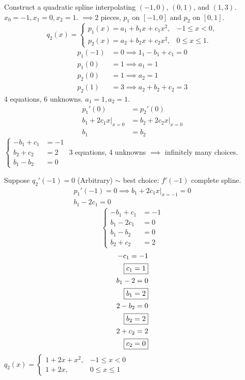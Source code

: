\documentclass[]{article}
\begin{document}
\begin{example}
	Construct a quadratic spline interpolating $(-1,0)$, $(0,1)$, and $(1,3)$.
	$x_0=-1,x_1=0,x_2=1$. 
	$\implies 2$ pieces, $p_1$ on $[-1,0]$ and $p_2$ on $[0,1]$.
	$$ q_2(x) = \begin{cases} p_1(x) = a_1+b_1x+c_1x^2, & -1\leq x<0, \\ p_2(x) = a_2+b_2x+c_2x^2, & 0\leq x\leq1. \end{cases} $$
	\begin{align*}
		p_1(-1) &= 0 \implies 1_1-b_1+c_1 = 0 \\
		p_1(0) &= 1 \implies a_1 = 1 \\
		p_2(0) &= 1 \implies a_2 = 1 \\
		p_2(1) &= 3 \implies a_2+b_2+c_2 = 3
	\end{align*}
	4 equations, 6 unknowns. $a_1=1,a_2=1$.
	\begin{align*}
		p_1'(0) &= p_2'(0) \\
		b_1+2c_1x\big|_{x=0} &= b_2 + 2c_2x\big|_{x=0} \\
		b_1 &= b_2
	\end{align*}
	$\begin{cases} -b_1+c_1 &= -1 \\ b_2+c_2 &= 2 \\ b_1-b_2 &= 0 \end{cases}$ 3 equations, 4 unknowns $\implies$ infinitely many choices.
	
	Suppose $q_2'(-1)=0$ (Arbitrary) $\sim$ best choice: $f'(-1)$ complete spline.
	\begin{align*}
		p_1'(-1) = 0 \implies b_1+2c_1x\big|_{x=-1} = 0 \\
		b_1 - 2c_1 = 0
	\end{align*}
	$$ \begin{cases} -b_1 + c_1 &= -1 \\ b_1-2c_1 &= 0 \\ b_1-b_2 &= 0 \\ b_2 + c_2 &=2 \end{cases}$$
	\begin{align*}
		-c_1 = -1 \\
		\fbox{$c_1=1$} \\
		b_1-2 = 0 \\
		\fbox{$b_1=2$} \\
		2-b_2=0 \\
		\fbox{$b_2=2$} \\
		2+c_2=2 \\
		\fbox{$c_2=0$}
	\end{align*}
	$ q_2(x) = \begin{cases} 1+2x+x^2, & -1\leq x<0 \\ 1+2x, & 0\leq x\leq 1 \end{cases}$
\end{example}
\end{document}
